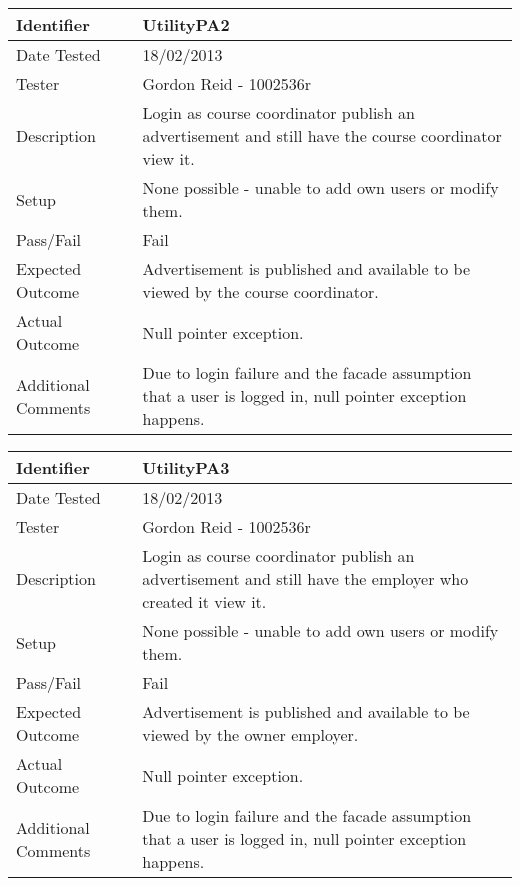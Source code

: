 \begin{tabularx}{\textwidth}{|T|L|}
\hline
Identifier & UtilityPA2\\
\hline
Date Tested & 18/02/2013\\
\hline
Tester & Gordon Reid - 1002536r\\
\hline
Description & Login as course coordinator publish an advertisement and still
have the course coordinator view it.\\
\hline
Setup & None possible - unable to add own users or modify them.\\
\hline
Pass/Fail & Fail\\
\hline
Expected Outcome & Advertisement is published and available to be viewed by the
course coordinator.\\
\hline
Actual Outcome & Null pointer exception.\\
\hline
Additional Comments & Due to login failure and the facade assumption that a user 
is logged in, null pointer exception happens.\\
\hline
\end{tabularx}

\vspace{2em}

\begin{tabularx}{\textwidth}{|T|L|}
\hline
Identifier & UtilityPA3\\
\hline
Date Tested & 18/02/2013\\
\hline
Tester & Gordon Reid - 1002536r\\
\hline
Description & Login as course coordinator publish an advertisement and still
have the employer who created it view it.\\
\hline
Setup & None possible - unable to add own users or modify them.\\
\hline
Pass/Fail & Fail\\
\hline
Expected Outcome & Advertisement is published and available to be viewed by the
owner employer.\\
\hline
Actual Outcome & Null pointer exception.\\
\hline
Additional Comments & Due to login failure and the facade assumption that a user 
is logged in, null pointer exception happens.\\
\hline
\end{tabularx}

\vspace{2em}


